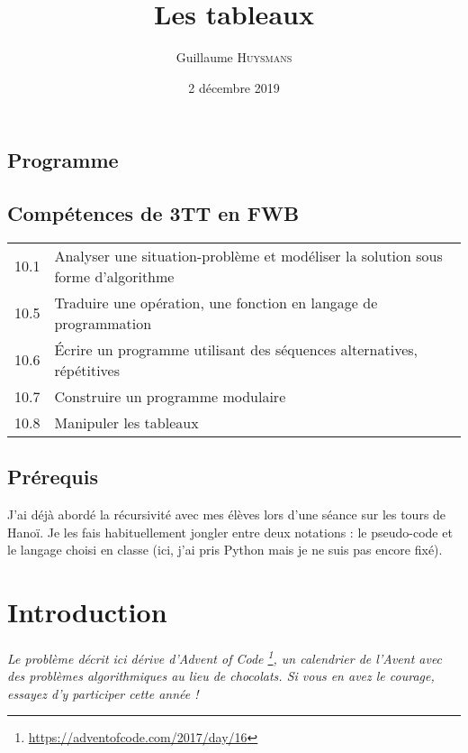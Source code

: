 
\title{Les tableaux}
\author{Guillaume \textsc{Huysmans}}%
\date{2 décembre 2019}

\maketitle

\begin{teacheronly}
\section*{Programme}
\subsection*{Compétences de 3TT en FWB}
\begin{tabular}{l|l}
10.1 & Analyser une situation-problème et
	modéliser la solution sous forme d'algorithme \\
10.5 & Traduire une opération, une fonction en langage de programmation \\
10.6 & Écrire un programme utilisant des séquences alternatives, répétitives \\
10.7 & Construire un programme modulaire \\
10.8 & Manipuler les tableaux
\end{tabular}
\subsection*{Prérequis}
J'ai déjà abordé la récursivité avec mes élèves lors d'une séance sur les tours
de Hanoï. Je les fais habituellement jongler entre deux notations : le
pseudo-code et le langage choisi en classe (ici, j'ai pris Python mais je ne
suis pas encore fixé).
\end{teacheronly}

\section{Introduction}

\emph{Le problème décrit ici dérive d'Advent of Code
\footnote{\url{https://adventofcode.com/2017/day/16}},
un calendrier de l'Avent avec
des problèmes algorithmiques au lieu de chocolats. Si vous en avez le courage,
essayez d'y participer cette année !}

